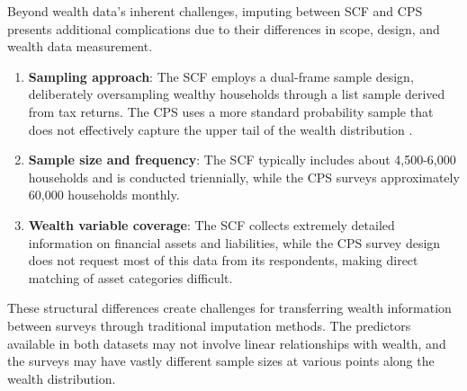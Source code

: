 Beyond wealth data's inherent challenges, imputing between SCF and CPS presents additional complications due to their differences in scope, design, and wealth data measurement.

\begin{enumerate}
    \item \textbf{Sampling approach}: The SCF employs a dual-frame sample design, deliberately oversampling wealthy households through a list sample derived from tax returns. The CPS uses a more standard probability sample that does not effectively capture the upper tail of the wealth distribution \citep{bryant2023general}.
    \item \textbf{Sample size and frequency}: The SCF typically includes about 4,500-6,000 households and is conducted triennially, while the CPS surveys approximately 60,000 households monthly.
    \item \textbf{Wealth variable coverage}: The SCF collects extremely detailed information on financial assets and liabilities, while the CPS survey design does not request most of this data from its respondents, making direct matching of asset categories difficult.
\end{enumerate}

These structural differences create challenges for transferring wealth information between surveys through traditional imputation methods. The predictors available in both datasets may not involve linear relationships with wealth, and the surveys may have vastly different sample sizes at various points along the wealth distribution.